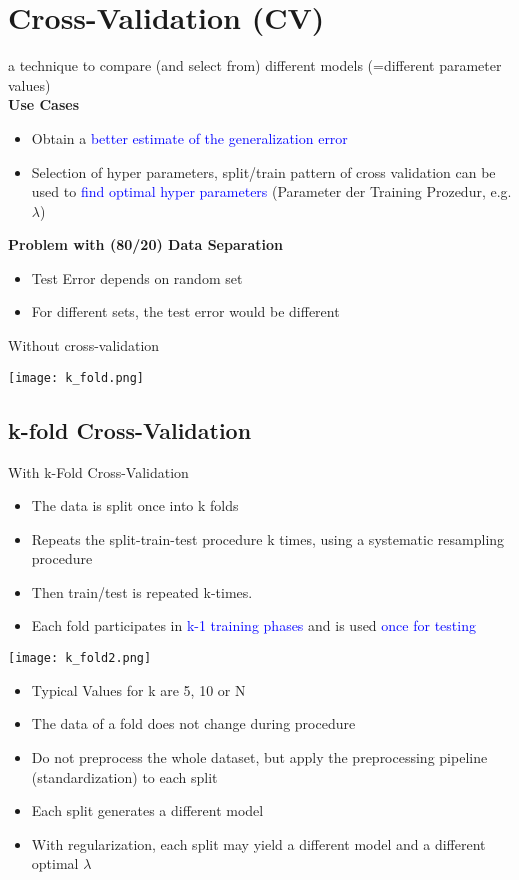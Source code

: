 \section{Cross-Validation (CV)}
a technique to compare (and select from) different models (=different parameter values) \\

\textbf{Use Cases}

\begin{itemize}
    \item Obtain a \textcolor{blue}{better estimate of the generalization error}
    \item Selection of hyper parameters, split/train pattern of cross validation can be used to \textcolor{blue}{find optimal hyper parameters} (Parameter der Training Prozedur, e.g. $\lambda$)
\end{itemize}
\vspace{10pt}
\textbf{Problem with (80/20) Data Separation}
\begin{itemize}
    \item Test Error depends on random set
    \item For different sets, the test error would be different
\end{itemize}
\vspace{10pt}
Without cross-validation

\texttt{[image: k\_fold.png]}

\subsection{k-fold Cross-Validation}

With k-Fold Cross-Validation\\

\begin{itemize}
    \item The data is split once into k folds
    \item Repeats the split-train-test procedure k times, using a systematic resampling procedure
    \item Then train/test is repeated k-times.
    \item Each fold participates in \textcolor{blue}{k-1 training phases} and is used \textcolor{blue}{once for testing}
\end{itemize}

\texttt{[image: k\_fold2.png]}

\begin{itemize}
    \item Typical Values for k are 5, 10 or N
    \item The data of a fold does not change during procedure
    \item Do not preprocess the whole dataset, but apply the preprocessing pipeline (standardization) to each split
    \item Each split generates a different model
    \item With regularization, each split may yield a different  model and a different optimal $\lambda$
\end{itemize}


